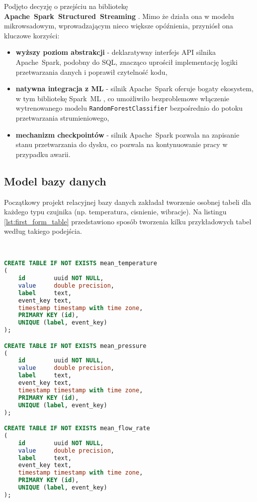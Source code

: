 Podjęto decyzję o przejściu na bibliotekę \textbf{\mbox{Apache Spark Structured Streaming}} \cite{spark_streaming}. Mimo że działa ona w modelu mikrowsadowym, wprowadzającym nieco większe opóźnienia, przyniósł ona kluczowe korzyści:
\begin{itemize}
    \item \textbf{wyższy poziom abstrakcji} - deklaratywny interfejs API silnika \mbox{Apache Spark}, podobny do SQL, znacząco uprościł implementację logiki przetwarzania danych i poprawił czytelność kodu,
    \item \textbf{natywna integracja z ML} - silnik \mbox{Apache Spark} oferuje bogaty ekosystem, w tym bibliotekę \mbox{Spark ML} \cite{spark_streaming}, co umożliwiło bezproblemowe włączenie wytrenowanego modelu \texttt{RandomForestClassifier} bezpośrednio do potoku przetwarzania strumieniowego,
    \item \textbf{mechanizm checkpointów} - silnik \mbox{Apache Spark} pozwala na zapisanie stanu przetwarzania do dysku, co pozwala na kontynuowanie pracy w przypadku awarii.
\end{itemize}

\subsection{Model bazy danych}

Początkowy projekt relacyjnej bazy danych zakładał tworzenie osobnej tabeli dla każdego typu czujnika (np. temperatura, cisnienie, wibracje). Na listingu \ref{lst:first_form_table} przedstawiono sposób tworzenia kilku przykładowych tabel według takiego podejścia.

\begin{lstlisting}[caption=Pierwsza forma tabeli w relacyjnej bazie danych, label={lst:first_form_table},language=SQL]


CREATE TABLE IF NOT EXISTS mean_temperature
(
    id        uuid NOT NULL,
    value     double precision,
    label     text,
    event_key text,
    timestamp timestamp with time zone,
    PRIMARY KEY (id),
    UNIQUE (label, event_key)
);

CREATE TABLE IF NOT EXISTS mean_pressure
(
    id        uuid NOT NULL,
    value     double precision,
    label     text,
    event_key text,
    timestamp timestamp with time zone,
    PRIMARY KEY (id),
    UNIQUE (label, event_key)
);

CREATE TABLE IF NOT EXISTS mean_flow_rate
(
    id        uuid NOT NULL,
    value     double precision,
    label     text,
    event_key text,
    timestamp timestamp with time zone,
    PRIMARY KEY (id),
    UNIQUE (label, event_key)
);

\end{lstlisting}

